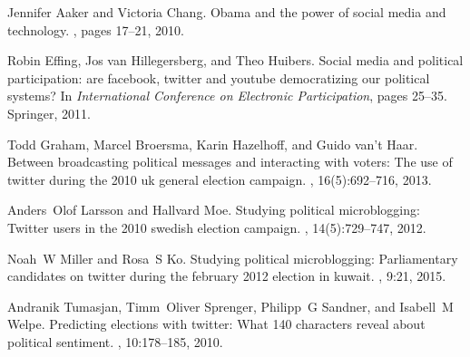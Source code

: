 \documentclass{llncs}
\begin{document}
%
%
\begin{thebibliography}{5}
%
Jennifer Aaker and Victoria Chang.
\newblock Obama and the power of social media and technology.
, pages 17--21, 2010.

Robin Effing, Jos van Hillegersberg, and Theo Huibers.
\newblock Social media and political participation: are facebook, twitter and
youtube democratizing our political systems?
\newblock In {\em International Conference on Electronic Participation}, pages
25--35. Springer, 2011.

Todd Graham, Marcel Broersma, Karin Hazelhoff, and Guido van't Haar.
\newblock Between broadcasting political messages and interacting with voters:
The use of twitter during the 2010 uk general election campaign.
, 16(5):692--716, 2013.

Anders~Olof Larsson and Hallvard Moe.
\newblock Studying political microblogging: Twitter users in the 2010 swedish
election campaign.
, 14(5):729--747, 2012.

Noah~W Miller and Rosa~S Ko.
\newblock Studying political microblogging: Parliamentary candidates on twitter
during the february 2012 election in kuwait.
, 9:21, 2015.

Andranik Tumasjan, Timm~Oliver Sprenger, Philipp~G Sandner, and Isabell~M
Welpe.
\newblock Predicting elections with twitter: What 140 characters reveal about
political sentiment.
, 10:178--185, 2010.



\end{thebibliography}

\clearpage
{} %
\renewcommand{\indexname}{Author Index}
\printindex
\clearpage
\end{document}
